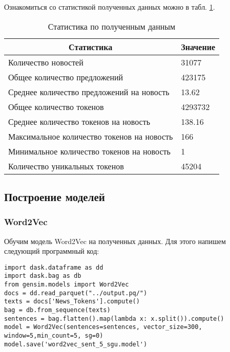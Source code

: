 \documentclass[coursework]{SCWorks}
\begin{document}
Ознакомиться со статистикой полученных данных можно в табл. \ref{table:preprocess}.
\begin{table}[!h]
    \centering
    \begin{tabular}{|l|l|}
    \hline
    \multicolumn{1}{|c|}{\textbf{Статистика}}  & \multicolumn{1}{c|}{\textbf{Значение}} \\ \hline
    Количество новостей                        & 31077                                  \\ \hline
    Общее количество предложений               & 423175                                 \\ \hline
    Среднее количество предложений на новость  & 13.62                                  \\ \hline
    Общее количество токенов                   & 4293732                                \\ \hline
    Среднее количество токенов на новость      & 138.16                                 \\ \hline
    Максимальное количество токенов на новость & 166                                    \\ \hline
    Минимальное количество токенов на новость  & 1                                      \\ \hline
    Количество уникальных токенов              & 45204                                  \\ \hline
    \end{tabular} 
    \caption{Статистика по полученным данным}
    \label{table:preprocess}
\end{table}

\subsection{Построение моделей}
\subsubsection{Word2Vec}
Обучим модель Word2Vec на полученных данных. Для этого напишем следующий программный код:
\begin{verbatim}
import dask.dataframe as dd
import dask.bag as db
from gensim.models import Word2Vec
docs = dd.read_parquet("../output.pq/")
texts = docs['News_Tokens'].compute()
bag = db.from_sequence(texts)
sentences = bag.flatten().map(lambda x: x.split()).compute()
model = Word2Vec(sentences=sentences, vector_size=300, window=5,min_count=5, sg=0)
model.save('word2vec_sent_5_sgu.model')
\end{verbatim}
\end{document}
